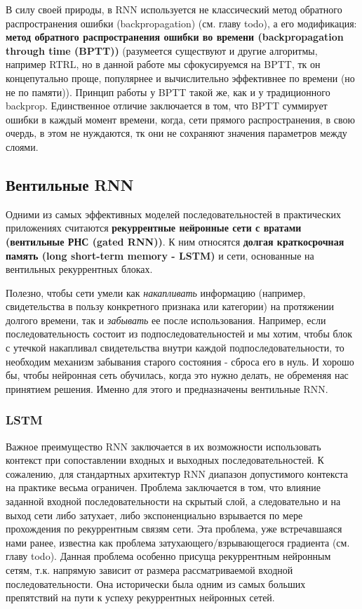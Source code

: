 В силу своей природы, в RNN используется не классический метод обратного 
распространения ошибки (backpropagation) 
(см. главу {\color{red} todo}), а его модификация: 
\textbf{метод обратного распространения ошибки во времени 
(backpropagation through time (BPTT))} (разумеется существуют 
и другие алгоритмы, например RTRL, но в данной работе мы сфокусируемся на 
BPTT, тк он концепутально проще, популярнее и вычислительно эффективнее по времени 
(но не по памяти)). Принцип работы у BPTT такой же, как и у 
традиционного backprop. Единственное отличие заключается в том, что BPTT 
суммирует ошибки в каждый момент времени, когда, сети прямого распространения, 
в свою очердь, в этом не нуждаются, тк они не сохраняют значения параметров между 
слоями.

\subsection{Вентильные RNN}

Одними из самых эффективных моделей последовательностей в практических 
приложениях считаются \textbf{рекуррентные нейронные сети с вратами 
(вентильные РНС (gated RNN))}. К ним относятся
\textbf{долгая краткосрочная память (long short-term memory - LSTM)} 
и сети, основанные на вентильных рекуррентных блоках. 

Полезно, чтобы сети умели как \textit{накапливать} информацию 
(например, свидетельства в пользу конкретного признака или категории) на 
протяжении долгого времени, так и \textit{забывать} ее после использования. 
Например, если последовательность состоит из подпоследовательностей 
и мы хотим, чтобы блок с утечкой накапливал свидетельства
внутри каждой подпоследовательности, то необходим механизм забывания старого
состояния - сброса его в нуль. И хорошо бы, чтобы нейронная сеть обучилась, 
когда это нужно делать, не обременяя нас принятием решения. 
Именно для этого и предназначены вентильные RNN.

\subsubsection{LSTM}

Важное преимущество RNN заключается в их возможности использовать 
контекст при сопоставлении входных и выходных последовательностей. 
К сожалению, для стандартных архитектур RNN диапазон допустимого контекста 
на практике весьма ограничен. Проблема заключается в том, что влияние 
заданной входной последовательности на скрытый слой, а следовательно и 
на выход сети либо затухает, либо экспоненциально взрывается по мере 
прохождения по рекуррентным связям сети. Эта проблема, уже встречавшаяся 
нами ранее, известна как проблема затухающего/взрывающегося градиента 
(см. главу {\color{red} todo}). Данная проблема особенно присуща 
рекуррентным нейронным сетям, т.к. напрямую зависит от размера рассматриваемой 
входной последовательности. Она исторически была одним из самых 
больших препятствий на пути к успеху рекуррентных нейронных сетей.

